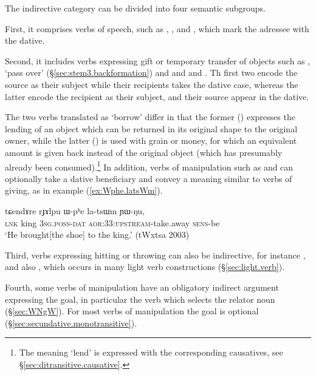 The indirective category can be divided into four semantic subgroups. 

First, it comprises verbs of speech, such as , ,   and , which mark the adressee with the dative.

Second, it includes verbs expressing gift or temporary transfer of objects such as , `pass over' (§\ref{sec:stem3.backformation}) and  and   and . Th first two encode the source as their subject while their recipients takes the dative case, whereas the latter encode the recipient as their subject, and their source appear in the dative. 

The two verbs translated as `borrow' differ in that the former () expresses the lending of an object which can be returned in its original shape to the original owner, while the latter () is used with grain or money, for which an equivalent amount is given back instead of the original object (which has presumably already been consumed).\footnote{The meaning `lend' is expressed with the corresponding causatives, see §\ref{sec:ditransitive.causative}.} In addition, verbs of manipulation such as  and  can optionally take a dative beneficiary and convey a meaning similar to verbs of giving, as in example (\ref{ex:Wphe.latsWm}).

\begin{exe}
	\ex \label{ex:Wphe.latsWm}
	\gll  tɕendɤre rɟɤlpu ɯ-pʰe la-tsɯm ɲɯ-ŋu,  \\
	\textsc{lnk}  king \textsc{3sg}.\textsc{poss}-\textsc{dat} \textsc{aor}:3\fl{}3:\textsc{upstream}-take.away \textsc{sens}-be \\
	\glt `He brought[the shoe] to the king.'  (tWxtsa 2003)
\end{exe}

Third, verbs expressing hitting or throwing can also be indirective, for instance , and also , which occurs in many light verb constructions (§\ref{sec:light.verb}).

Fourth, some verbs of manipulation have an obligatory indirect argument expressing the goal, in particular the verb  which selects the relator noun  (§\ref{sec:WNgW}). For most verbs of manipulation the goal is optional  (§\ref{sec:secundative.monotransitive}).

